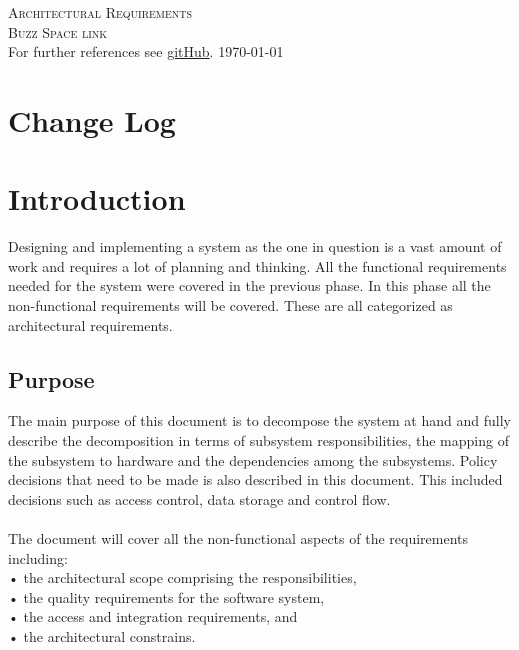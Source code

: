 \documentclass[a4paper,12pt]{report}
\begin{document}
\renewcommand{\thesection}{\arabic{section}}
\newpage
\begin{center}
\textsc{\LARGE Architectural Requirements}\\[1.5cm]
\textsc{\Large Buzz Space link}\\[0.5cm]
For further references see \href{https://github.com/COS301-Group-3-A-Phase2/Part2-Mini-Project.git}{gitHub}.
\today
\end{center}
\tableofcontents{}

\newpage

\section{Change Log}

\section{Introduction}
Designing and implementing a system as the one in question is a vast amount of work and requires a lot of planning and thinking. All the functional requirements needed for the system were covered in the previous phase. In this phase all the non-functional requirements will be covered. These are all categorized as architectural requirements.  \\
\subsection{Purpose}
The main purpose of this document is to decompose the system at hand and fully describe the decomposition in terms of subsystem responsibilities, the mapping of the subsystem to hardware and the dependencies among the subsystems. Policy decisions that need to be made is also described in this document. This included decisions such as access control, data storage and control flow.\\\\
The document will cover all the non-functional aspects of the requirements including:\\
•	the architectural scope comprising the responsibilities,\\
•	the quality requirements for the software system,\\
•	the access and integration requirements, and\\
•	the architectural constrains. \\
\end{document}
